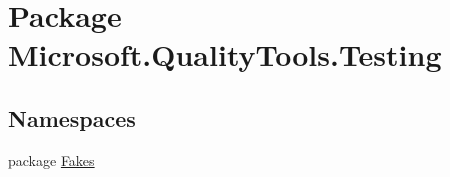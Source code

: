 \hypertarget{namespace_microsoft_1_1_quality_tools_1_1_testing}{\section{Package Microsoft.\-Quality\-Tools.\-Testing}
\label{namespace_microsoft_1_1_quality_tools_1_1_testing}
}
\subsection*{Namespaces}
\begin{DoxyCompactItemize}
\item 
package \hyperlink{namespace_microsoft_1_1_quality_tools_1_1_testing_1_1_fakes}{Fakes}
\end{DoxyCompactItemize}
